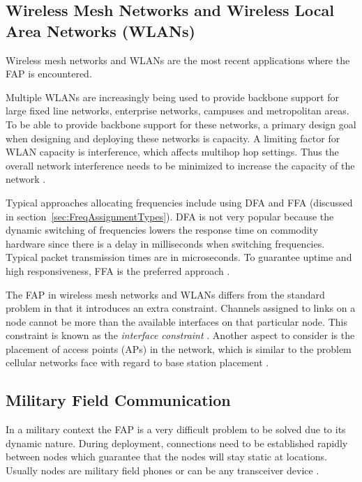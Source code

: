\subsection{Wireless Mesh Networks and Wireless Local Area Networks (WLANs)}
Wireless mesh networks and WLANs are the most recent applications where the \gls{FAP} is encountered. 

Multiple WLANs are increasingly being used to provide backbone support for large fixed line networks, enterprise networks, campuses and metropolitan areas\cite{MultiradioMeshNetworks}. To be able to provide backbone support for these networks, a primary design goal when designing and deploying these networks is capacity\cite{MultiradioMeshNetworks}. A limiting factor for WLAN capacity is interference, which affects multihop hop settings. Thus the overall network interference needs to be minimized to increase the capacity of the network \cite{MultiradioMeshNetworks}. 

Typical approaches allocating frequencies include using \gls{DFA} and \gls{FFA} (discussed in section~\ref{sec:FreqAssignmentTypes}). \gls{DFA} is not very popular because the dynamic switching of frequencies lowers the response time on commodity hardware since there is a delay in milliseconds when switching frequencies. Typical packet transmission times are in microseconds. To guarantee uptime and high responsiveness, \gls{FFA} is the preferred approach \cite{MultiradioMeshNetworks}.

The \gls{FAP} in wireless mesh networks and WLANs differs from the standard problem in that it introduces an extra constraint. Channels assigned to links on a node cannot be more than the available interfaces on that particular node. This constraint is known as the \emph{interface constraint} \cite{MultiradioMeshNetworks}. Another aspect to consider is the placement of access points (APs) in the network, which is similar to the problem cellular networks face with regard to base station placement \cite{Karen2004}.

\subsection{Military Field Communication}
In a military context the \gls{FAP} is a very difficult problem to be solved due to its dynamic nature\cite{CALMA}. During deployment, connections need to be established rapidly between nodes which guarantee that the nodes will stay static at locations. Usually nodes are military field phones or can be any transceiver device \cite{CALMA,DynamicFAP}. 

